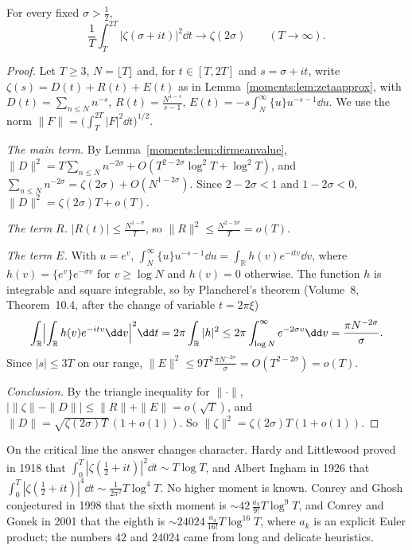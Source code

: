 \begin{theorem}\label{moments:thm:meansquare}
For every fixed $\sigma>\frac12$,
\[
\frac1T\int_T^{2T}|\zeta(\sigma+it)|^2\dd t\longrightarrow\zeta(2\sigma)\qquad(T\to\infty).
\]
\end{theorem}
\begin{proof}
Let $T\ge3$, $N=\lfloor T\rfloor$ and, for $t\in[T,2T]$ and $s=\sigma+it$, write $\zeta(s)=D(t)+R(t)+E(t)$ as in Lemma~\ref{moments:lem:zetaapprox}, with
$D(t)=\sum_{n\le N}n^{-s}$, $R(t)=\frac{N^{1-s}}{s-1}$, $E(t)=-s\int_N^\infty\{u\}u^{-s-1}\dd u$. We use the norm $\|F\|=\bigl(\int_T^{2T}|F|^2\dd t\bigr)^{1/2}$.

\emph{The main term.} By Lemma~\ref{moments:lem:dirmeanvalue}, $\|D\|^2=T\sum_{n\le N}n^{-2\sigma}+O(T^{2-2\sigma}\log^2T+\log^2T)$, and
$\sum_{n\le N}n^{-2\sigma}=\zeta(2\sigma)+O(N^{1-2\sigma})$. Since $2-2\sigma<1$ and $1-2\sigma<0$, $\|D\|^2=\zeta(2\sigma)T+o(T)$.

\emph{The term $R$.} $|R(t)|\le\frac{N^{1-\sigma}}T$, so $\|R\|^2\le\frac{N^{2-2\sigma}}T=o(T)$.

\emph{The term $E$.} With $u=e^v$, $\int_N^\infty\{u\}u^{-s-1}\dd u=\int_{\mathbb R}h(v)e^{-itv}\dd v$, where $h(v)=\{e^v\}e^{-\sigma v}$ for $v\ge\log N$ and $h(v)=0$
otherwise. The function $h$ is integrable and square integrable, so by Plancherel's theorem (Volume~8, Theorem~10.4, after the change of variable $t=2\pi\xi$)
\[
\int_{\mathbb R}\Bigl|\int_{\mathbb R}h(v)e^{-itv}\dd v\Bigr|^2\dd t=2\pi\int_{\mathbb R}|h|^2\le2\pi\int_{\log N}^\infty e^{-2\sigma v}\dd v=\frac{\pi N^{-2\sigma}}\sigma.
\]
Since $|s|\le3T$ on our range, $\|E\|^2\le9T^2\frac{\pi N^{-2\sigma}}\sigma=O(T^{2-2\sigma})=o(T)$.

\emph{Conclusion.} By the triangle inequality for $\|\cdot\|$, $\bigl|\|\zeta\|-\|D\|\bigr|\le\|R\|+\|E\|=o(\sqrt T)$, and $\|D\|=\sqrt{\zeta(2\sigma)T}\,(1+o(1))$. So
$\|\zeta\|^2=\zeta(2\sigma)T(1+o(1))$.
\end{proof}

On the critical line the answer changes character. Hardy and Littlewood proved in 1918 that $\int_0^T|\zeta(\frac12+it)|^2\dd t\sim T\log T$, and Albert
Ingham in 1926 that $\int_0^T|\zeta(\frac12+it)|^4\dd t\sim\frac1{2\pi^2}T\log^4T$. No higher moment is known. Conrey and Ghosh conjectured in 1998 that
the sixth moment is $\sim42\,\frac{a_3}{9!}T\log^9T$, and Conrey and Gonek in 2001 that the eighth is $\sim24024\,\frac{a_4}{16!}T\log^{16}T$, where $a_k$ is
an explicit Euler product; the numbers $42$ and $24024$ came from long and delicate heuristics.

